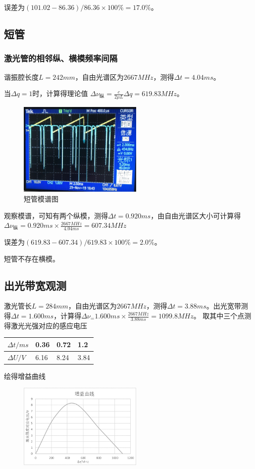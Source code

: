 \documentclass[UTF8]{ctexart}
\begin{document}
\begin{multicols}{2}
误差为$(101.02-86.36)/86.36\times100\%=17.0\%$。

\subsection{短管}
\subsubsection{激光管的相邻纵、横模频率间隔}
谐振腔长度$L=242mm$，自由光谱区为$2667MHz$，测得$\Delta t=4.04ms$。

当$\Delta q=1$时，计算得理论值
\newline $\Delta \nu_{\mbox{纵}}=\frac{c}{2 \mu L} \Delta q=619.83MHz$。

\begin{figure}[H]
\centering
\includegraphics[width=6cm]{short-lengthways}
\caption{短管模谱图}
\end{figure}

观察模谱，可知有两个纵模，测得$\Delta t=0.920ms$，由自由光谱区大小可计算得
\newline$\Delta \nu_{\mbox{纵}}=0.920ms\times\frac{2667MHz}{4.04ms}=607.34MHz$

误差为$(619.83-607.34)/619.83\times100\%=2.0\%$。

短管不存在横模。

\subsection{出光带宽观测}
激光管长$L=284mm$，自由光谱区为$2667MHz$，测得$\Delta t=3.88ms$。出光宽带测得$\Delta t=1.600ms$，计算得$\Delta \nu_=1.600ms\times\frac{2667MHz}{3.88ms}=1099.8MHz$。
取其中三个点测得激光光强对应的感应电压
\begin{table}[H]
\centering
\tiny
\begin{tabular}{|l|l|l|l|}
\hline
$\Delta t/ms$ & 0.36 & 0.72 & 1.2  \\ \hline
$\Delta U/V$  & 6.16 & 8.24 & 3.84 \\ \hline
\end{tabular}
\end{table}
绘得增益曲线
\begin{figure}[H]
\centering
\includegraphics[width=6cm]{u-v}
\end{figure}


\end{multicols}
\end{document}
